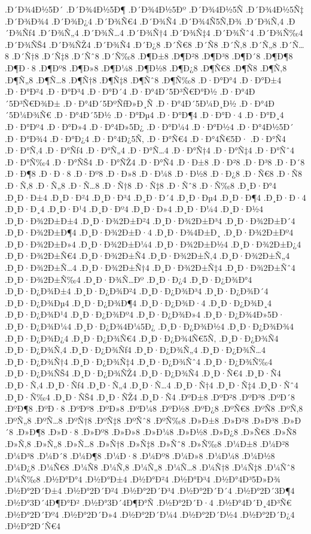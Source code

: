 {.Ð´Ð¾4Ð½5Ð´
.Ð´Ð¾4Ð½5Ð¶
.Ð´Ð¾4Ð½5Ðº
.Ð´Ð¾4Ð½5Ñ
.Ð´Ð¾4Ð½5Ñ‡
.Ð´Ð¾Ð¾4
.Ð´Ð¾Ð¿4
.Ð´Ð¾Ñ€4
.Ð´Ð¾Ñ4
.Ð´Ð¾4Ñ5Ñ‚Ð¾
.Ð´Ð¾Ñ‚4
.Ð´Ð¾Ñƒ4
.Ð´Ð¾Ñ„4
.Ð´Ð¾Ñ…4
.Ð´Ð¾Ñ†4
.Ð´Ð¾Ñ‡4
.Ð´Ð¾Ñˆ4
.Ð´Ð¾Ñ‰4
.Ð´Ð¾ÑŠ4
.Ð´Ð¾ÑŽ4
.Ð´Ð¾Ñ4
.Ð´Ð¿8
.Ð´Ñ€8
.Ð´Ñ8
.Ð´Ñ‚8
.Ð´Ñ„8
.Ð´Ñ…8
.Ð´Ñ†8
.Ð´Ñ‡8
.Ð´Ñˆ8
.Ð´Ñ‰8
.Ð¶Ð±8
.Ð¶Ð²8
.Ð¶Ð³8
.Ð¶Ð´8
.Ð¶Ð¶8
.Ð¶Ð·8
.Ð¶Ðº8
.Ð¶Ð»8
.Ð¶Ð¼8
.Ð¶Ð½8
.Ð¶Ð¿8
.Ð¶Ñ€8
.Ð¶Ñ8
.Ð¶Ñ‚8
.Ð¶Ñ„8
.Ð¶Ñ…8
.Ð¶Ñ†8
.Ð¶Ñ‡8
.Ð¶Ñˆ8
.Ð¶Ñ‰8
.Ð·Ð°Ð°4
.Ð·Ð°Ð±4
.Ð·Ð°Ð²4
.Ð·Ð°Ð³4
.Ð·Ð°Ð´4
.Ð·Ð°4Ð´5Ð³Ñ€Ð°Ð½
.Ð·Ð°4Ð´5Ð³Ñ€Ð¾Ð±
.Ð·Ð°4Ð´5ÐºÑƒÐ»Ð¸Ñ
.Ð·Ð°4Ð´5Ð¼Ð¸Ð½
.Ð·Ð°4Ð´5Ð¼Ð¾Ñ€
.Ð·Ð°4Ð´5Ð½
.Ð·Ð°Ðµ4
.Ð·Ð°Ð¶4
.Ð·Ð°Ð·4
.Ð·Ð°Ð¸4
.Ð·Ð°Ðº4
.Ð·Ð°Ð»4
.Ð·Ð°4Ð»5Ð¿
.Ð·Ð°Ð¼4
.Ð·Ð°Ð½4
.Ð·Ð°4Ð½5Ð´
.Ð·Ð°Ð¾4
.Ð·Ð°Ð¿4
.Ð·Ð°4Ð¿5Ñ‚
.Ð·Ð°Ñ€4
.Ð·Ð°4Ñ€5Ð·
.Ð·Ð°Ñ4
.Ð·Ð°Ñ‚4
.Ð·Ð°Ñƒ4
.Ð·Ð°Ñ„4
.Ð·Ð°Ñ…4
.Ð·Ð°Ñ†4
.Ð·Ð°Ñ‡4
.Ð·Ð°Ñˆ4
.Ð·Ð°Ñ‰4
.Ð·Ð°ÑŠ4
.Ð·Ð°ÑŽ4
.Ð·Ð°Ñ4
.Ð·Ð±8
.Ð·Ð²8
.Ð·Ð³8
.Ð·Ð´8
.Ð·Ð¶8
.Ð·Ð·8
.Ð·Ðº8
.Ð·Ð»8
.Ð·Ð¼8
.Ð·Ð½8
.Ð·Ð¿8
.Ð·Ñ€8
.Ð·Ñ8
.Ð·Ñ‚8
.Ð·Ñ„8
.Ð·Ñ…8
.Ð·Ñ†8
.Ð·Ñ‡8
.Ð·Ñˆ8
.Ð·Ñ‰8
.Ð¸Ð·Ð°4
.Ð¸Ð·Ð±4
.Ð¸Ð·Ð²4
.Ð¸Ð·Ð³4
.Ð¸Ð·Ð´4
.Ð¸Ð·Ðµ4
.Ð¸Ð·Ð¶4
.Ð¸Ð·Ð·4
.Ð¸Ð·Ð¸4
.Ð¸Ð·Ð¹4
.Ð¸Ð·Ðº4
.Ð¸Ð·Ð»4
.Ð¸Ð·Ð¼4
.Ð¸Ð·Ð½4
.Ð¸Ð·Ð¾2Ð±Ð±4
.Ð¸Ð·Ð¾2Ð±Ð²4
.Ð¸Ð·Ð¾2Ð±Ð³4
.Ð¸Ð·Ð¾2Ð±Ð´4
.Ð¸Ð·Ð¾2Ð±Ð¶4
.Ð¸Ð·Ð¾2Ð±Ð·4
.Ð¸Ð·Ð¾4Ð±Ð¸
.Ð¸Ð·Ð¾2Ð±Ðº4
.Ð¸Ð·Ð¾2Ð±Ð»4
.Ð¸Ð·Ð¾2Ð±Ð¼4
.Ð¸Ð·Ð¾2Ð±Ð½4
.Ð¸Ð·Ð¾2Ð±Ð¿4
.Ð¸Ð·Ð¾2Ð±Ñ€4
.Ð¸Ð·Ð¾2Ð±Ñ4
.Ð¸Ð·Ð¾2Ð±Ñ‚4
.Ð¸Ð·Ð¾2Ð±Ñ„4
.Ð¸Ð·Ð¾2Ð±Ñ…4
.Ð¸Ð·Ð¾2Ð±Ñ†4
.Ð¸Ð·Ð¾2Ð±Ñ‡4
.Ð¸Ð·Ð¾2Ð±Ñˆ4
.Ð¸Ð·Ð¾2Ð±Ñ‰4
.Ð¸Ð·Ð¾Ñ…Ðº
.Ð¸Ð·Ð¿4
.Ð¸Ð·Ð¿Ð¾Ð°4
.Ð¸Ð·Ð¿Ð¾Ð±4
.Ð¸Ð·Ð¿Ð¾Ð²4
.Ð¸Ð·Ð¿Ð¾Ð³4
.Ð¸Ð·Ð¿Ð¾Ð´4
.Ð¸Ð·Ð¿Ð¾Ðµ4
.Ð¸Ð·Ð¿Ð¾Ð¶4
.Ð¸Ð·Ð¿Ð¾Ð·4
.Ð¸Ð·Ð¿Ð¾Ð¸4
.Ð¸Ð·Ð¿Ð¾Ð¹4
.Ð¸Ð·Ð¿Ð¾Ðº4
.Ð¸Ð·Ð¿Ð¾Ð»4
.Ð¸Ð·Ð¿Ð¾4Ð»5Ð·
.Ð¸Ð·Ð¿Ð¾Ð¼4
.Ð¸Ð·Ð¿Ð¾4Ð¼5Ð¿
.Ð¸Ð·Ð¿Ð¾Ð½4
.Ð¸Ð·Ð¿Ð¾Ð¾4
.Ð¸Ð·Ð¿Ð¾Ð¿4
.Ð¸Ð·Ð¿Ð¾Ñ€4
.Ð¸Ð·Ð¿Ð¾4Ñ€5Ñ‚
.Ð¸Ð·Ð¿Ð¾Ñ4
.Ð¸Ð·Ð¿Ð¾Ñ‚4
.Ð¸Ð·Ð¿Ð¾Ñƒ4
.Ð¸Ð·Ð¿Ð¾Ñ„4
.Ð¸Ð·Ð¿Ð¾Ñ…4
.Ð¸Ð·Ð¿Ð¾Ñ†4
.Ð¸Ð·Ð¿Ð¾Ñ‡4
.Ð¸Ð·Ð¿Ð¾Ñˆ4
.Ð¸Ð·Ð¿Ð¾Ñ‰4
.Ð¸Ð·Ð¿Ð¾ÑŠ4
.Ð¸Ð·Ð¿Ð¾ÑŽ4
.Ð¸Ð·Ð¿Ð¾Ñ4
.Ð¸Ð·Ñ€4
.Ð¸Ð·Ñ4
.Ð¸Ð·Ñ‚4
.Ð¸Ð·Ñƒ4
.Ð¸Ð·Ñ„4
.Ð¸Ð·Ñ…4
.Ð¸Ð·Ñ†4
.Ð¸Ð·Ñ‡4
.Ð¸Ð·Ñˆ4
.Ð¸Ð·Ñ‰4
.Ð¸Ð·ÑŠ4
.Ð¸Ð·ÑŽ4
.Ð¸Ð·Ñ4
.ÐºÐ±8
.ÐºÐ²8
.ÐºÐ³8
.ÐºÐ´8
.ÐºÐ¶8
.ÐºÐ·8
.ÐºÐº8
.ÐºÐ»8
.ÐºÐ¼8
.ÐºÐ½8
.ÐºÐ¿8
.ÐºÑ€8
.ÐºÑ8
.ÐºÑ‚8
.ÐºÑ„8
.ÐºÑ…8
.ÐºÑ†8
.ÐºÑ‡8
.ÐºÑˆ8
.ÐºÑ‰8
.Ð»Ð±8
.Ð»Ð²8
.Ð»Ð³8
.Ð»Ð´8
.Ð»Ð¶8
.Ð»Ð·8
.Ð»Ðº8
.Ð»Ð»8
.Ð»Ð¼8
.Ð»Ð½8
.Ð»Ð¿8
.Ð»Ñ€8
.Ð»Ñ8
.Ð»Ñ‚8
.Ð»Ñ„8
.Ð»Ñ…8
.Ð»Ñ†8
.Ð»Ñ‡8
.Ð»Ñˆ8
.Ð»Ñ‰8
.Ð¼Ð±8
.Ð¼Ð²8
.Ð¼Ð³8
.Ð¼Ð´8
.Ð¼Ð¶8
.Ð¼Ð·8
.Ð¼Ðº8
.Ð¼Ð»8
.Ð¼Ð¼8
.Ð¼Ð½8
.Ð¼Ð¿8
.Ð¼Ñ€8
.Ð¼Ñ8
.Ð¼Ñ‚8
.Ð¼Ñ„8
.Ð¼Ñ…8
.Ð¼Ñ†8
.Ð¼Ñ‡8
.Ð¼Ñˆ8
.Ð¼Ñ‰8
.Ð½Ð°Ð°4
.Ð½Ð°Ð±4
.Ð½Ð°Ð²4
.Ð½Ð°Ð³4
.Ð½Ð°4Ð³5Ð»Ð¾
.Ð½Ð°2Ð´Ð±4
.Ð½Ð°2Ð´Ð²4
.Ð½Ð°2Ð´Ð³4
.Ð½Ð°2Ð´Ð´4
.Ð½Ð°2Ð´3Ð¶4
.Ð½Ð°3Ð´4Ð¶Ð°Ð²
.Ð½Ð°3Ð´4Ð¶Ð°Ñ
.Ð½Ð°2Ð´Ð·4
.Ð½Ð°4Ð´Ð¸4Ð³Ñ€
.Ð½Ð°2Ð´Ðº4
.Ð½Ð°2Ð´Ð»4
.Ð½Ð°2Ð´Ð¼4
.Ð½Ð°2Ð´Ð½4
.Ð½Ð°2Ð´Ð¿4
.Ð½Ð°2Ð´Ñ€4
}
